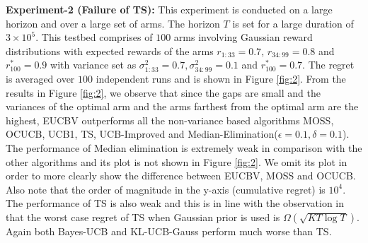 \textbf{Experiment-2 (Failure of TS):} This experiment is conducted on a large horizon and over a large set of arms. The horizon $T$ is set for a large duration of $3\times 10^{5}$. This testbed comprises of $100$ arms involving Gaussian reward distributions with expected rewards of the arms $r_{1:33}=0.7$, $r_{34:99}=0.8$ and $r^{*}_{100}=0.9$ with variance set as $\sigma_{1:33}^{2} = 0.7,\sigma_{34:99}^{2} = 0.1$ and $r^{*}_{100}=0.7$. The regret is averaged over $100$ independent runs and is shown in Figure \ref{fig:2}. From the results in Figure \ref{fig:2}, we observe that since the gaps are small and the variances of the optimal arm and the arms farthest from the optimal arm are the highest, EUCBV outperforms all the non-variance based algorithms MOSS, OCUCB, UCB1, TS, UCB-Improved and Median-Elimination($\epsilon=0.1,\delta=0.1$). The performance of Median elimination is extremely weak in comparison with the other algorithms and its plot is not shown in Figure \ref{fig:2}. We omit its plot in order to more clearly show the difference between EUCBV, MOSS and OCUCB. Also note that the order of magnitude in the y-axis (cumulative regret) is $10^4$. The performance of TS is also weak and this is in line with the observation in  \citet{lattimore2015optimally} that the worst case regret of TS when Gaussian prior is used is $\Omega\left( \sqrt{KT\log T}\right)$. Again both Bayes-UCB and KL-UCB-Gauss perform much worse than TS. 

